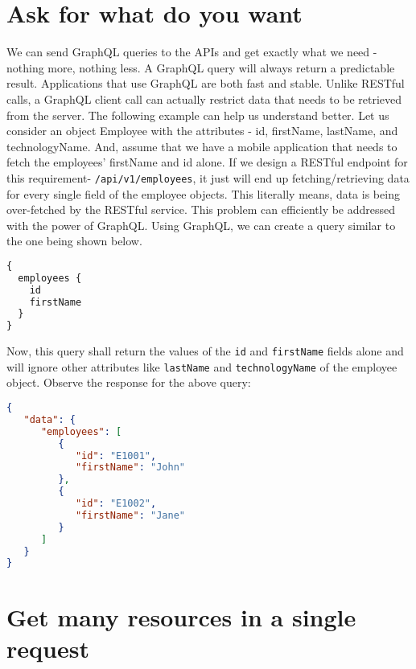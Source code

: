 \documentclass[../main.tex]{subfiles}
\begin{document}
\section{Ask for what do you want}
We can send GraphQL queries to the APIs and get exactly what we need - nothing more, nothing less.
A GraphQL query will always return a predictable result.
Applications that use GraphQL are both fast and stable.
Unlike RESTful calls, a GraphQL client call can actually restrict data that needs to be retrieved from the server.
The following example can help us understand better.
Let us consider an object Employee with the attributes - id, firstName, lastName, and technologyName.
And, assume that we have a mobile application that needs to fetch the employees' firstName and id alone.
If we design a RESTful endpoint for this requirement- \lstinline{/api/v1/employees}, it just will end up fetching/retrieving data for every single field of the employee objects.
This literally means, data is being over-fetched by the RESTful service.
This problem can efficiently be addressed with the power of GraphQL.
Using GraphQL, we can create a query similar to the one being shown below.
\begin{lstlisting}[language=GraphQL, caption={Employee fetch id and name only using GraphQL query}, label={lst:fetch-employee-id-first-name}]
{
  employees {
    id
    firstName
  }
}
\end{lstlisting}
Now, this query shall return the values of the \lstinline{id} and \lstinline{firstName} fields alone and will ignore other attributes like \lstinline{lastName} and \lstinline{technologyName} of the employee object.
Observe the response for the above query:
\begin{lstlisting}[language=json, caption = {Employee fetch id and name only response}, label={lst:fetch-emp-id-1-name-resp}]
  {
   "data": {
      "employees": [
         {
            "id": "E1001",
            "firstName": "John"
         },
         {
            "id": "E1002",
            "firstName": "Jane"
         }
      ]
   }
}
\end{lstlisting}


\section{Get many resources in a single request}
\end{document}
